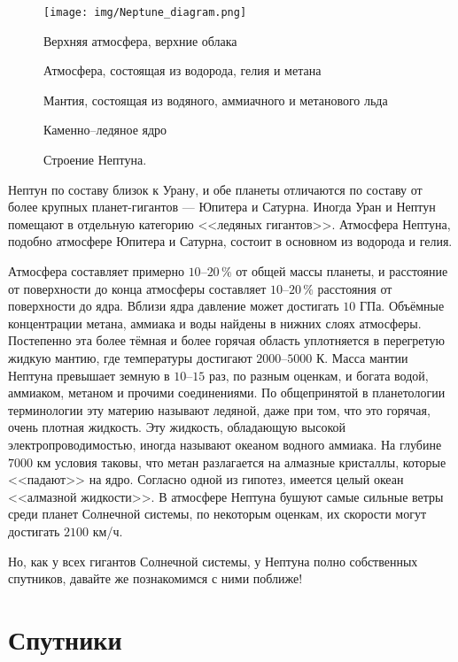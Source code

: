 \documentclass[12pt]{article}
\numberwithin{equation}{section} %
\theoremstyle{definition}\newtheorem{defi}{Определение}
\newenvironment{note_enum}{%
\begin{framed}
  
  \begin{small}
  \begin{enumerate}[wide, labelwidth=!, labelindent=0pt]
    \vspace{-1pc}
}{%
  \end{enumerate}
  \end{small}
  \vspace{-1pc}
\end{framed}
}
\begin{document}
\begin{wrapfigure}{r}{0.4\textwidth}
  \vspace{-1pc}
  \center \texttt{[image: img/Neptune\_diagram.png]}
  \caption{Строение Нептуна.}
  \vspace{-1pc}
  \begin{note_enum}
    \item Верхняя атмосфера, верхние облака
    \item Атмосфера, состоящая из водорода, гелия и метана
    \item Мантия, состоящая из водяного, аммиачного и метанового льда
    \item Каменно--ледяное ядро
  \end{note_enum}
\end{wrapfigure}

Нептун по составу близок к Урану, и обе планеты отличаются по составу от более крупных планет-гигантов — Юпитера и Сатурна. Иногда Уран и Нептун помещают в отдельную категорию <<ледяных гигантов>>. Атмосфера Нептуна, подобно атмосфере Юпитера и Сатурна, состоит в основном из водорода и гелия. 

Атмосфера составляет примерно $10$--$20\,\%$ от общей массы планеты, и расстояние от поверхности до конца атмосферы составляет $10$--$20\,\%$ расстояния от поверхности до ядра. Вблизи ядра давление может достигать $10$ ГПа. Объёмные концентрации метана, аммиака и воды найдены в нижних слоях атмосферы. Постепенно эта более тёмная и более горячая область уплотняется в перегретую жидкую мантию, где температуры достигают $2000$--$5000$ К. Масса мантии Нептуна превышает земную в $10$--$15$ раз, по разным оценкам, и богата водой, аммиаком, метаном и прочими соединениями. По общепринятой в планетологии терминологии эту материю называют ледяной, даже при том, что это горячая, очень плотная жидкость. Эту жидкость, обладающую высокой электропроводимостью, иногда называют океаном водного аммиака. На глубине $7000$ км условия таковы, что метан разлагается на алмазные кристаллы, которые <<падают>> на ядро. Согласно одной из гипотез, имеется целый океан <<алмазной жидкости>>. В атмосфере Нептуна бушуют самые сильные ветры среди планет Солнечной системы, по некоторым оценкам, их скорости могут достигать $2100$ км/ч.

Но, как у всех гигантов Солнечной системы, у Нептуна полно собственных спутников, давайте же познакомимся с ними поближе!

\section{Спутники}
\end{document}
